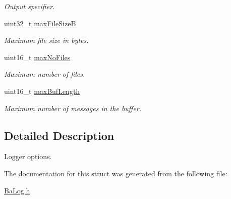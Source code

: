 \begin{DoxyCompactItemize}
\begin{DoxyCompactList}\small\item\em Output specifier. \end{DoxyCompactList}\item 
uint32\+\_\+t \hyperlink{structTBaLogOptions_a29fd5d2fc74f16b3734076ad356a4e4f}{max\+File\+SizeB}\hypertarget{structTBaLogOptions_a29fd5d2fc74f16b3734076ad356a4e4f}{}\label{structTBaLogOptions_a29fd5d2fc74f16b3734076ad356a4e4f}

\begin{DoxyCompactList}\small\item\em Maximum file size in bytes. \end{DoxyCompactList}\item 
uint16\+\_\+t \hyperlink{structTBaLogOptions_ad166ebc564ffd6f03051f299e04f42ee}{max\+No\+Files}\hypertarget{structTBaLogOptions_ad166ebc564ffd6f03051f299e04f42ee}{}\label{structTBaLogOptions_ad166ebc564ffd6f03051f299e04f42ee}

\begin{DoxyCompactList}\small\item\em Maximum number of files. \end{DoxyCompactList}\item 
uint16\+\_\+t \hyperlink{structTBaLogOptions_a40c96f001cb6655087b0c6f70704645c}{max\+Buf\+Length}\hypertarget{structTBaLogOptions_a40c96f001cb6655087b0c6f70704645c}{}\label{structTBaLogOptions_a40c96f001cb6655087b0c6f70704645c}

\begin{DoxyCompactList}\small\item\em Maximum number of messages in the buffer. \end{DoxyCompactList}\end{DoxyCompactItemize}


\subsection{Detailed Description}
Logger options. 

The documentation for this struct was generated from the following file\+:\begin{DoxyCompactItemize}
\item 
\hyperlink{BaLog_8h}{Ba\+Log.\+h}\end{DoxyCompactItemize}
